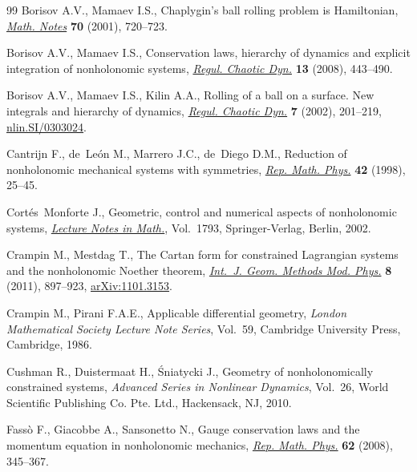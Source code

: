 \documentclass[10pt,a4paper]{amsart}
\numberwithin{equation}{section}
\begin{document}
\begin{thebibliography}{99}
Borisov A.V., Mamaev I.S., Chaplygin's ball rolling problem is {H}amiltonian,
  \href{http://dx.doi.org/10.1023/A:1012995330780}{\textit{Math. Notes}} \textbf{70} (2001), 720--723.

Borisov A.V., Mamaev I.S., Conservation laws, hierarchy of dynamics and
  explicit integration of nonholonomic systems, \href{http://dx.doi.org/10.1134/S1560354708050079}{\textit{Regul. Chaotic Dyn.}}
  \textbf{13} (2008), 443--490.

Borisov A.V., Mamaev I.S., Kilin A.A., Rolling of a ball on a surface. {N}ew
  integrals and hierarchy of dynamics, \href{http://dx.doi.org/10.1070/RD2002v007n02ABEH000205}{\textit{Regul. Chaotic Dyn.}} \textbf{7}
  (2002), 201--219, \href{http://arxiv.org/abs/nlin.SI/0303024}{nlin.SI/0303024}.

Cantrijn F., de~Le{\'o}n M., Marrero J.C., de~Diego D.M., Reduction of
  nonholonomic mechanical systems with symmetries, \href{http://dx.doi.org/10.1016/S0034-4877(98)80003-7}{\textit{Rep. Math. Phys.}}
  \textbf{42} (1998), 25--45.

Cort{\'e}s~Monforte J., Geometric, control and numerical aspects of
  nonholonomic systems, \href{http://dx.doi.org/10.1007/b84020}{\textit{Lecture Notes in Math.}}, Vol.~1793,
  Springer-Verlag, Berlin, 2002.

Crampin M., Mestdag T., The {C}artan form for constrained {L}agrangian systems
  and the nonholonomic {N}oether theorem, \href{http://dx.doi.org/10.1142/S0219887811005452}{\textit{Int.~J. Geom. Methods Mod.
  Phys.}} \textbf{8} (2011), 897--923, \href{http://arxiv.org/abs/1101.3153}{arXiv:1101.3153}.

Crampin M., Pirani F.A.E., Applicable dif\/ferential geometry, \textit{London
  Mathematical Society Lecture Note Series}, Vol.~59, Cambridge University
  Press, Cambridge, 1986.

Cushman R., Duistermaat H., {\'S}niatycki J., Geometry of nonholonomically
  constrained systems, \textit{Advanced Series in Nonlinear Dynamics}, Vol.~26,
  World Scientif\/ic Publishing Co. Pte. Ltd., Hackensack, NJ, 2010.

Fass{\`o} F., Giacobbe A., Sansonetto N., Gauge conservation laws and the
  momentum equation in nonholonomic mechanics, \href{http://dx.doi.org/10.1016/S0034-4877(09)00005-6}{\textit{Rep. Math. Phys.}}
  \textbf{62} (2008), 345--367.


\end{thebibliography}
\end{document}
